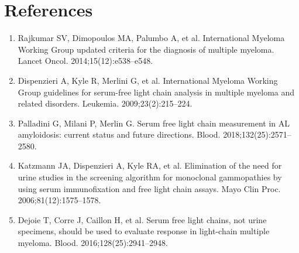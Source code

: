\section*{References}
\begin{enumerate}
  \item Rajkumar SV, Dimopoulos MA, Palumbo A, et al. International Myeloma Working Group updated criteria for the diagnosis of multiple myeloma. Lancet Oncol. 2014;15(12):e538--e548.
  \item Dispenzieri A, Kyle R, Merlini G, et al. International Myeloma Working Group guidelines for serum-free light chain analysis in multiple myeloma and related disorders. Leukemia. 2009;23(2):215--224.
  \item Palladini G, Milani P, Merlin G. Serum free light chain measurement in AL amyloidosis: current status and future directions. Blood. 2018;132(25):2571--2580.
  \item Katzmann JA, Dispenzieri A, Kyle RA, et al. Elimination of the need for urine studies in the screening algorithm for monoclonal gammopathies by using serum immunofixation and free light chain assays. Mayo Clin Proc. 2006;81(12):1575--1578.
  \item Dejoie T, Corre J, Caillon H, et al. Serum free light chains, not urine specimens, should be used to evaluate response in light-chain multiple myeloma. Blood. 2016;128(25):2941--2948.
\end{enumerate}

\clearpage
